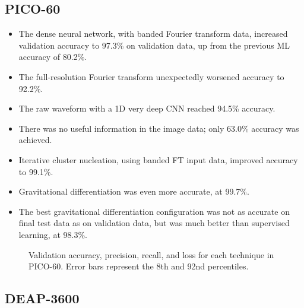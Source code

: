 \documentclass[12pt]{article}
\begin{document}
\subsection{PICO-60}

\begin{itemize}
    \item The dense neural network, with banded Fourier transform data, increased validation accuracy to 97.3\% on validation data, up from the previous ML accuracy of 80.2\%.
    \item The full-resolution Fourier transform unexpectedly worsened accuracy to 92.2\%.
    \item The raw waveform with a 1D very deep CNN reached 94.5\% accuracy.
    \item There was no useful information in the image data; only 63.0\% accuracy was achieved.
    \item Iterative cluster nucleation, using banded FT input data, improved accuracy to 99.1\%.
    \item Gravitational differentiation was even more accurate, at 99.7\%.
    \item The best gravitational differentiation configuration was not as accurate on final test data as on validation data, but was much better than supervised learning, at 98.3\%.
\end{itemize}

\begin{figure}[ht]
    \centering
    \caption{Validation accuracy, precision, recall, and loss for each technique in PICO-60. Error bars represent the 8th and 92nd percentiles.}
\end{figure}

\subsection{DEAP-3600}
\end{document}

